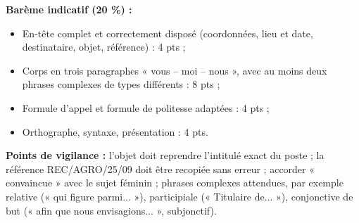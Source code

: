 \documentclass[11pt]{article}
\begin{document}
\begin{corrige}
\textbf{Barème indicatif (20 \%) :}
\begin{itemize}
\item En-tête complet et correctement disposé (coordonnées, lieu et date, destinataire, objet, référence) : 4 pts ;
\item Corps en trois paragraphes « vous – moi – nous », avec au moins deux phrases complexes de types différents : 8 pts ;
\item Formule d'appel et formule de politesse adaptées : 4 pts ;
\item Orthographe, syntaxe, présentation : 4 pts.
\end{itemize}
\textbf{Points de vigilance :} l'objet doit reprendre l'intitulé exact du poste ; la référence REC/AGRO/25/09 doit être recopiée sans erreur ; accorder « convaincue » avec le sujet féminin ; phrases complexes attendues, par exemple relative (« qui figure parmi... »), participiale (« Titulaire de... »), conjonctive de but (« afin que nous envisagions... », subjonctif).
\end{corrige}
\end{document}
